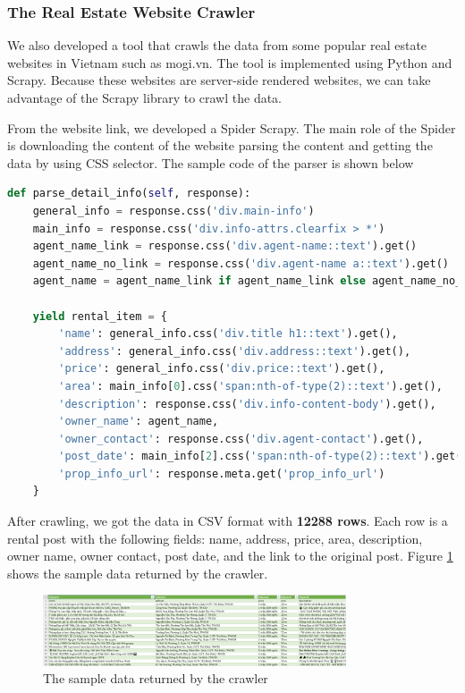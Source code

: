 \subsubsection{The Real Estate Website Crawler}
We also developed a tool that crawls the data from some popular real estate websites in Vietnam such as mogi.vn. The tool is implemented using Python and Scrapy. Because these websites are server-side rendered websites, we can take advantage of the Scrapy library to crawl the data. 

From the website link, we developed a Spider Scrapy. The main role of the Spider is downloading the content of the website parsing the content and getting the data by using CSS selector. The sample code of the parser is shown below

\begin{lstlisting}[language=Python]
def parse_detail_info(self, response):
    general_info = response.css('div.main-info')
    main_info = response.css('div.info-attrs.clearfix > *')
    agent_name_link = response.css('div.agent-name::text').get()
    agent_name_no_link = response.css('div.agent-name a::text').get()
    agent_name = agent_name_link if agent_name_link else agent_name_no_link

    yield rental_item = {
        'name': general_info.css('div.title h1::text').get(),
        'address': general_info.css('div.address::text').get(),
        'price': general_info.css('div.price::text').get(),
        'area': main_info[0].css('span:nth-of-type(2)::text').get(),
        'description': response.css('div.info-content-body').get(),
        'owner_name': agent_name,
        'owner_contact': response.css('div.agent-contact').get(),
        'post_date': main_info[2].css('span:nth-of-type(2)::text').get(),
        'prop_info_url': response.meta.get('prop_info_url')
    }
\end{lstlisting}

After crawling, we got the data in CSV format with \textbf{12288 rows}. Each row is a rental post with the following fields: name, address, price, area, description, owner name, owner contact, post date, and the link to the original post. Figure \ref{fig:sample-crawling-data} shows the sample data returned by the crawler. 

\begin{figure}[ht]
    \centering
    \includegraphics[width=0.8\textwidth]{Images/9.Implementation/sample_crawling_data.png}
    \caption{The sample data returned by the crawler}
    \label{fig:sample-crawling-data}
\end{figure}

